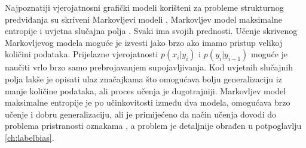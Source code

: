 Najpoznatiji vjerojatnosni grafički modeli korišteni za probleme strukturnog
predviđanja su skriveni Markovljevi modeli ,
Markovljev model maksimalne entropije 
i uvjetna slučajna polja . Svaki ima
svojih prednosti. Učenje skrivenog Markovljevog modela moguće je izvesti jako
brzo ako imamo pristup velikoj količini podataka. Prijelazne vjerojatnosti
$p(x_i | y_i)$ i $p(y_i | y_{i-1})$ moguće je naučiti vrlo brzo samo
prebrojavanjem supojavljivanja. Kod uvjetnih slučajnih polja lakše je opisati
ulaz značajkama što omogućava bolju generalizaciju iz manje količine podataka,
ali proces učenja je dugotrajniji. Markovljev model maksimalne entropije je po
učinkovitosti između dva modela, omogućava brzo učenje i dobru generalizaciju,
ali je primijećeno da način učenja dovodi do problema pristranosti oznakama
 \citep{lafferty2001conditional}, a problem je detaljnije
obrađen u potpoglavlju \ref{ch:labelbias}.

